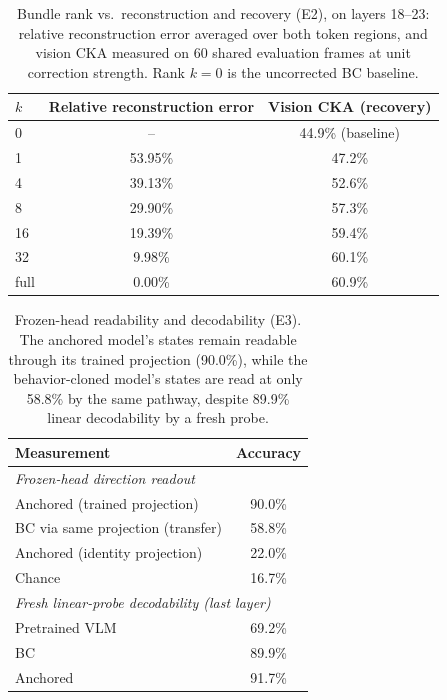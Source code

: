 \documentclass{article}
\begin{document}
\begin{table}[H]
	\centering
	\caption{Bundle rank vs.\ reconstruction and recovery (E2), on layers 18--23: relative
	reconstruction error averaged over both token regions, and vision CKA measured on
	60 shared evaluation frames at unit correction strength. Rank $k{=}0$ is the uncorrected BC baseline.}
	\label{tab:app_e2}
	\footnotesize
	\begin{tabular}{lcc}
		\toprule
		$k$ & Relative reconstruction error & Vision CKA (recovery) \\
		\midrule
		0 & -- & 44.9\% (baseline) \\
		1  & 53.95\% & 47.2\% \\
		4  & 39.13\% & 52.6\% \\
		8  & 29.90\% & 57.3\% \\
		16 & 19.39\% & 59.4\% \\
		32 & 9.98\%  & 60.1\% \\
		full & 0.00\% & 60.9\% \\
		\bottomrule
	\end{tabular}
\end{table}

\begin{table}[H]
	\centering
	\caption{Frozen-head readability and decodability (E3). The anchored model's states remain
	readable through its trained projection (90.0\%), while the behavior-cloned model's states are
	read at only 58.8\% by the same pathway, despite 89.9\% linear decodability by a fresh probe.}
	\label{tab:app_e3}
	\footnotesize
	\begin{tabular}{lc}
		\toprule
		Measurement & Accuracy \\
		\midrule
		\multicolumn{2}{l}{\emph{Frozen-head direction readout}} \\
		Anchored (trained projection) & 90.0\% \\
		BC via same projection (transfer) & 58.8\% \\
		Anchored (identity projection) & 22.0\% \\
		Chance & 16.7\% \\
		\midrule
		\multicolumn{2}{l}{\emph{Fresh linear-probe decodability (last layer)}} \\
		Pretrained VLM & 69.2\% \\
		BC & 89.9\% \\
		Anchored & 91.7\% \\
		\bottomrule
	\end{tabular}
\end{table}
\end{document}
